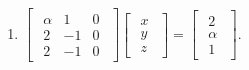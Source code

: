 \documentclass{article}
\begin{document}
\begin{enumerate}
\begin{enumerate}
                \item $\begin{bmatrix}\begin{array}{rrr} \alpha & 1 & 0\\ 2 & -1 & 0\\ 2 & -1 & 0 \end{array}\end{bmatrix} \begin{bmatrix}\begin{array}{r} x\\ y\\ z \end{array}\end{bmatrix} = \begin{bmatrix}\begin{array}{r} 2\\ \alpha \\ 1 \end{array}\end{bmatrix}$.
            \end{enumerate}

\end{enumerate}
\end{document}
